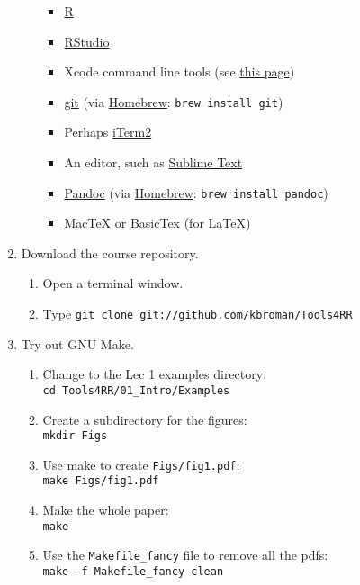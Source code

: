 \documentclass[12pt]{article}
\newcommand{\ttsm}{\tt \small}
\begin{document}
\begin{enumerate}
\begin{enumerate}
    \begin{itemize}
    \item \href{http://cran.rstudio.com/bin/macosx/}{R}
    \item \href{http://www.rstudio.com/products/rstudio/download}{RStudio}
    \item Xcode command line tools (see
      \href{http://railsapps.github.io/xcode-command-line-tools.html}{this
        page})
    \item \href{http://git-scm.com/download/mac}{git} (via
      \href{http://brew.sh/}{Homebrew}: {\ttsm brew install git})
    \item Perhaps \href{http://iterm2.com/}{iTerm2}
    \item An editor, such as
      \href{http://www.sublimetext.com/}{Sublime Text}
    \item \href{http://johnmacfarlane.net/pandoc/installing.html}{Pandoc}
        (via \href{http://brew.sh/}{Homebrew}: {\ttsm brew install pandoc})
    \item \href{https://tug.org/mactex/}{MacTeX} or
      \href{http://www.tug.org/mactex/morepackages.html}{BasicTex} (for LaTeX)
    \end{itemize}

  \end{enumerate}

\item Download the course repository.

  \begin{enumerate}
  \item Open a terminal window.
  \item Type {\ttsm git clone git://github.com/kbroman/Tools4RR}
  \end{enumerate}

\item Try out GNU Make.

  \begin{enumerate}
  \item Change to the Lec 1 examples directory: \\
    {\ttsm cd Tools4RR/01\_Intro/Examples}
  \item Create a subdirectory for the figures: \\
    {\ttsm mkdir Figs}
  \item Use make to create {\ttsm Figs/fig1.pdf}: \\
    {\ttsm make Figs/fig1.pdf}
  \item Make the whole paper:\\
    {\ttsm make}
  \item Use the {\ttsm Makefile\_fancy} file to remove all the
    pdfs:\\
    {\ttsm make -f Makefile\_fancy clean}
  \end{enumerate}

\end{enumerate}
\end{document}
